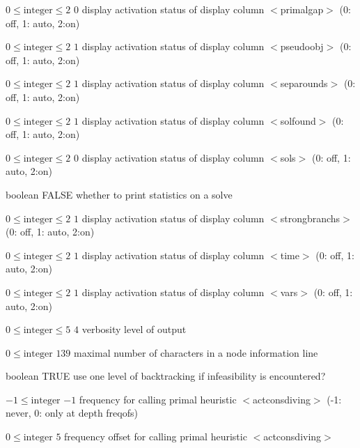 %
{$0\leq\textrm{integer}\leq2$}%
{$0$}%
{display activation status of display column $<$primalgap$>$ (0: off, 1: auto, 2:on)}%
{}

%
{$0\leq\textrm{integer}\leq2$}%
{$1$}%
{display activation status of display column $<$pseudoobj$>$ (0: off, 1: auto, 2:on)}%
{}

%
{$0\leq\textrm{integer}\leq2$}%
{$1$}%
{display activation status of display column $<$separounds$>$ (0: off, 1: auto, 2:on)}%
{}

%
{$0\leq\textrm{integer}\leq2$}%
{$1$}%
{display activation status of display column $<$solfound$>$ (0: off, 1: auto, 2:on)}%
{}

%
{$0\leq\textrm{integer}\leq2$}%
{$0$}%
{display activation status of display column $<$sols$>$ (0: off, 1: auto, 2:on)}%
{}

%
{boolean}%
{FALSE}%
{whether to print statistics on a solve}%
{}

%
{$0\leq\textrm{integer}\leq2$}%
{$1$}%
{display activation status of display column $<$strongbranchs$>$ (0: off, 1: auto, 2:on)}%
{}

%
{$0\leq\textrm{integer}\leq2$}%
{$1$}%
{display activation status of display column $<$time$>$ (0: off, 1: auto, 2:on)}%
{}

%
{$0\leq\textrm{integer}\leq2$}%
{$1$}%
{display activation status of display column $<$vars$>$ (0: off, 1: auto, 2:on)}%
{}

%
{$0\leq\textrm{integer}\leq5$}%
{$4$}%
{verbosity level of output}%
{}

%
{$0\leq\textrm{integer}$}%
{$139$}%
{maximal number of characters in a node information line}%
{}

%
{boolean}%
{TRUE}%
{use one level of backtracking if infeasibility is encountered?}%
{}

%
{$-1\leq\textrm{integer}$}%
{$-1$}%
{frequency for calling primal heuristic $<$actconsdiving$>$ (-1: never, 0: only at depth freqofs)}%
{}

%
{$0\leq\textrm{integer}$}%
{$5$}%
{frequency offset for calling primal heuristic $<$actconsdiving$>$}%
{}

